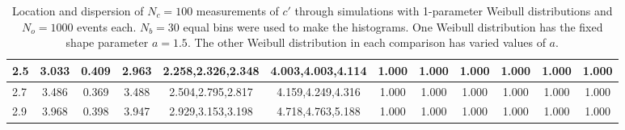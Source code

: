 \begin{table*}[h!]
\begin{center}
\begin{tabular}{| l | c | c | c | c | c | c | c | c | c | c | c |}
2.5 & 3.033 & 0.409 & 2.963 & 2.258,2.326,2.348 & 4.003,4.003,4.114  & 1.000  & 1.000  & 1.000  & 1.000  & 1.000  & 1.000 \\\hline
2.7 & 3.486 & 0.369 & 3.488 & 2.504,2.795,2.817 & 4.159,4.249,4.316  & 1.000  & 1.000  & 1.000  & 1.000  & 1.000  & 1.000 \\\hline
2.9 & 3.968 & 0.398 & 3.947 & 2.929,3.153,3.198 & 4.718,4.763,5.188  & 1.000  & 1.000  & 1.000  & 1.000  & 1.000  & 1.000 \\\hline
\end{tabular}
\caption{Location and dispersion of $N_c=100$
measurements of $c'$ through simulations
with 1-parameter Weibull distributions and $N_o=1000$ events each.
$N_b=30$ equal bins were used to make the histograms.
One Weibull distribution has the fixed shape parameter $a=1.5$.
The other Weibull distribution in each comparison
has varied values of $a$.}
\end{center}
\end{table*}